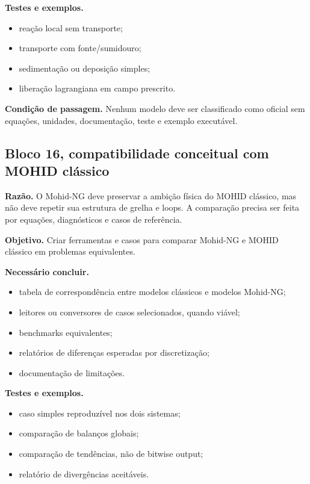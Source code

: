 \documentclass[11pt,a4paper]{article}
\begin{document}
\textbf{Testes e exemplos.}
\begin{itemize}
  \item rea\c{c}\~ao local sem transporte;
  \item transporte com fonte/sumidouro;
  \item sedimenta\c{c}\~ao ou deposi\c{c}\~ao simples;
  \item libera\c{c}\~ao lagrangiana em campo prescrito.
\end{itemize}

\textbf{Condi\c{c}\~ao de passagem.} Nenhum modelo deve ser classificado como oficial sem equa\c{c}\~oes, unidades, documenta\c{c}\~ao, teste e exemplo execut\'avel.

\subsection*{Bloco 16, compatibilidade conceitual com MOHID cl\'assico}

\textbf{Raz\~ao.} O Mohid-NG deve preservar a ambi\c{c}\~ao f\'isica do MOHID cl\'assico, mas n\~ao deve repetir sua estrutura de grelha e loops. A compara\c{c}\~ao precisa ser feita por equa\c{c}\~oes, diagn\'osticos e casos de refer\^encia.

\textbf{Objetivo.} Criar ferramentas e casos para comparar Mohid-NG e MOHID cl\'assico em problemas equivalentes.

\textbf{Necess\'ario concluir.}
\begin{itemize}
  \item tabela de correspond\^encia entre modelos cl\'assicos e modelos Mohid-NG;
  \item leitores ou conversores de casos selecionados, quando vi\'avel;
  \item benchmarks equivalentes;
  \item relat\'orios de diferen\c{c}as esperadas por discretiza\c{c}\~ao;
  \item documenta\c{c}\~ao de limita\c{c}\~oes.
\end{itemize}

\textbf{Testes e exemplos.}
\begin{itemize}
  \item caso simples reproduz\'ivel nos dois sistemas;
  \item compara\c{c}\~ao de balan\c{c}os globais;
  \item compara\c{c}\~ao de tend\^encias, n\~ao de bitwise output;
  \item relat\'orio de diverg\^encias aceit\'aveis.
\end{itemize}
\end{document}

